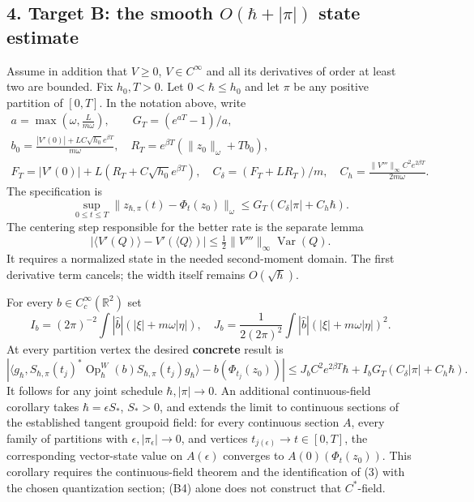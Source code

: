 \documentclass[11pt,a4paper]{article}
\begin{document}
\hypertarget{target-b-the-smooth-ohbarpi-state-estimate}{%
\subsection{\texorpdfstring{4. Target B: the smooth \(O(\hbar+|\pi|)\)
state
estimate}{4. Target B: the smooth O(\textbackslash hbar+\textbar\textbackslash pi\textbar) state estimate}}\label{target-b-the-smooth-ohbarpi-state-estimate}}

Assume in addition that \(V\ge0\), \(V\in C^\infty\) and all its
derivatives of order at least two are bounded. Fix \(h_0,T>0\). Let
\(0<\hbar\le h_0\) and let \(\pi\) be any positive partition of
\([0,T]\). In the notation above, write \[
 \begin{gathered}
 a=\max\!\left(\omega,\frac L{m\omega}\right),\qquad
 G_T=(e^{aT}-1)/a,\\
 b_0=\frac{|V'(0)|+LC\sqrt{h_0}e^{\beta T}}{m\omega},\quad
 R_T=e^{\beta T}(\|z_0\|_\omega+Tb_0),\\
 F_T=|V'(0)|+L(R_T+C\sqrt{h_0}e^{\beta T}),\quad
 C_\delta=(F_T+LR_T)/m,\quad
 C_h=\frac{\|V'''\|_\infty C^2e^{2\beta T}}{2m\omega}.
 \end{gathered} \tag{B0}
\] The specification is \[
 \sup_{0\le t\le T}\|z_{\hbar,\pi}(t)-\Phi_t(z_0)\|_\omega
 \le G_T(C_\delta|\pi|+C_h\hbar). \tag{B1}
\] The centering step responsible for the better rate is the separate
lemma \[
 |\langle V'(Q)\rangle-V'(\langle Q\rangle)|
 \le \tfrac12\|V'''\|_\infty\operatorname{Var}(Q). \tag{B2}
\] It requires a normalized state in the needed second-moment domain.
The first derivative term cancels; the width itself remains
\(O(\sqrt\hbar)\).

For every \(b\in C_c^\infty(\mathbb R^2)\) set \[
 I_b=(2\pi)^{-2}\!\int|\widehat b|(|\xi|+m\omega|\eta|),\quad
 J_b=\frac1{2(2\pi)^2}\!\int|\widehat b|
                         (|\xi|+m\omega|\eta|)^2. \tag{B3}
\] At every partition vertex the desired \textbf{concrete} result is \[
 \left|\langle g_\hbar,S_{\hbar,\pi}(t_j)^*
       \operatorname{Op}^W_\hbar(b)S_{\hbar,\pi}(t_j)g_\hbar\rangle
       -b(\Phi_{t_j}(z_0))\right|
 \le J_b C^2e^{2\beta T}\hbar+
      I_bG_T(C_\delta|\pi|+C_h\hbar). \tag{B4}
\] It follows for any joint schedule \(\hbar,|\pi|\to0\). An additional
continuous-field corollary takes \(\hbar=\epsilon S_*\), \(S_*>0\), and
extends the limit to continuous sections of the established tangent
groupoid field: for every continuous section \(A\), every family of
partitions with \(\epsilon,|\pi_\epsilon|\to0\), and vertices
\(t_{j(\epsilon)}\to t\in[0,T]\), the corresponding vector-state value
on \(A(\epsilon)\) converges to \(A(0)(\Phi_t(z_0))\). This corollary
requires the continuous-field theorem and the identification of (3) with
the chosen quantization section; (B4) alone does not construct that
\(C^*\)-field.
\end{document}
